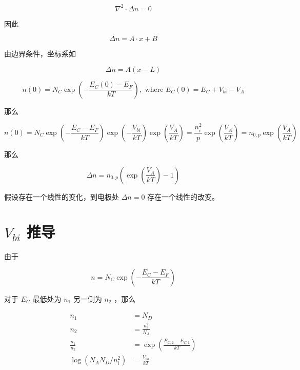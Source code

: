 \documentclass[cn,11pt,chinese,black,simple]{../elegantbook}
\begin{document}
\[\nabla^2 \cdot \Delta n = 0\]

因此 

\[\Delta n = A \cdot x + B\]

由边界条件，坐标系如


\[\Delta n = A(x - L) \]

\[n(0) = N_C \exp(- \frac{E_C(0) - E_F}{k T}), \text{ where } E_C(0) = E_C + V_{bi} - V_A\]

那么

\[n(0) = N_C \exp(-\frac{E_C-E_F}{kT}) \exp(-\frac{V_{bi}}{kT}) \exp(\frac{V_A}{kT}) = \frac{n_i^2}{p}\exp(\frac{V_A}{kT}) = n_{0,p}\exp(\frac{V_A}{kT})\]

那么 

\[\Delta n = n_{0,p}(\exp(\frac{V_A}{kT}) - 1)\]

假设存在一个线性的变化，到电极处 \(\Delta n = 0\) 存在一个线性的改变。



\section*{\(V_{bi}\) 推导}

由于 

\[n = N_C \exp(- \frac{E_C - E_F}{k T})\] 

对于 \(E_C\) 最低处为 \(n_1\) 另一侧为 \(n_2\) ，那么

\[
\begin{aligned}
    n_1 &= N_D \\
    n_2 &= \frac{n_i^2}{N_A} \\
    \frac{n_1}{n_2} &= \exp(\frac{E_{C,2} - E_{C,1}}{k T}) \\
    \log (N_A N_D / n_i^2) &= \frac{V_{bo}}{k T}
\end{aligned}    
\]

\let\chapname\undefined
\ifx\mainclass\undefined
\end{document}
